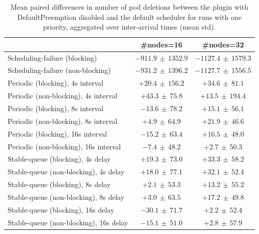\begin{table}[t]
\tiny
\setlength{\tabcolsep}{1.2pt}
\renewcommand{\arraystretch}{1.12}
\centering
\caption{Mean paired differences in number of pod deletions between the plugin with DefaultPreemption disabled and the default scheduler for runs with one priority, aggregated over inter-arrival times (mean \pm std).}
\label{tab:deletions-defpreempt0-prio1-std1-agg-arrival}
\begin{tabular}{l c c}
\toprule
 & \#nodes=16 & \#nodes=32 \\
\midrule
Scheduling-failure (blocking) & $-911.9\,\pm\,1352.9$ & $-1127.4\,\pm\,1579.3$ \\
Scheduling-failure (non-blocking) & $-931.2\,\pm\,1396.2$ & $-1127.7\,\pm\,1556.5$ \\
Periodic (blocking), 4s interval & $+20.4\,\pm\,156.2$ & $+34.6\,\pm\,81.1$ \\
Periodic (non-blocking), 4s interval & $+43.3\,\pm\,75.8$ & $+13.5\,\pm\,194.4$ \\
Periodic (blocking), 8s interval & $-13.6\,\pm\,78.2$ & $+15.1\,\pm\,56.1$ \\
Periodic (non-blocking), 8s interval & $+4.9\,\pm\,64.9$ & $+21.9\,\pm\,46.6$ \\
Periodic (blocking), 16s interval & $-15.2\,\pm\,63.4$ & $+16.5\,\pm\,48.0$ \\
Periodic (non-blocking), 16s interval & $-7.4\,\pm\,48.2$ & $+2.7\,\pm\,50.3$ \\
Stable-queue (blocking), 4s delay & $+19.3\,\pm\,73.0$ & $+33.3\,\pm\,58.2$ \\
Stable-queue (non-blocking), 4s delay & $+18.0\,\pm\,77.1$ & $+32.1\,\pm\,52.4$ \\
Stable-queue (blocking), 8s delay & $+2.1\,\pm\,53.3$ & $+13.2\,\pm\,55.2$ \\
Stable-queue (non-blocking), 8s delay & $+3.0\,\pm\,63.5$ & $+17.2\,\pm\,49.8$ \\
Stable-queue (blocking), 16s delay & $-30.1\,\pm\,71.7$ & $+2.2\,\pm\,52.4$ \\
Stable-queue (non-blocking), 16s delay & $-15.1\,\pm\,51.0$ & $+2.8\,\pm\,57.9$ \\
\bottomrule
\end{tabular}
\end{table}
